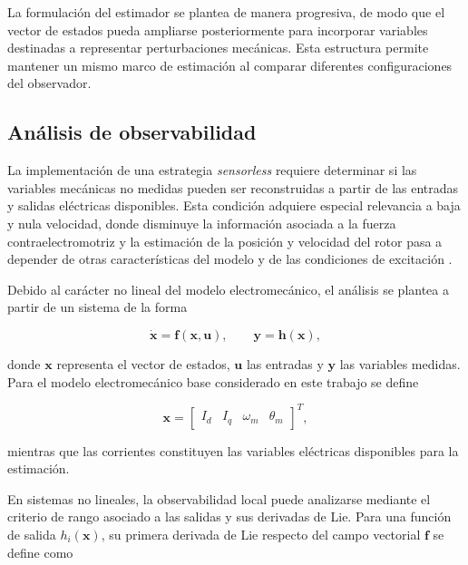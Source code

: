 La formulación del estimador se plantea de manera progresiva, de modo
que el vector de estados pueda ampliarse posteriormente para incorporar
variables destinadas a representar perturbaciones mecánicas. Esta
estructura permite mantener un mismo marco de estimación al comparar
diferentes configuraciones del observador.

\subsection{Análisis de observabilidad}
\label{subsec:analisis_observabilidad}

La implementación de una estrategia \textit{sensorless} requiere determinar si las
variables mecánicas no medidas pueden ser reconstruidas a partir de las entradas y
salidas eléctricas disponibles. Esta condición adquiere especial relevancia a baja y
nula velocidad, donde disminuye la información asociada a la fuerza
contraelectromotriz y la estimación de la posición y velocidad del rotor pasa a
depender de otras características del modelo y de las condiciones de excitación
\cite{zaltniObservabilityAnalysisPMSM2009,vaclavekACDriveObservability2013}.

Debido al carácter no lineal del modelo electromecánico, el análisis se plantea a
partir de un sistema de la forma

\begin{equation}
    \dot{\mathbf{x}}
    =
    \mathbf{f}(\mathbf{x},\mathbf{u}),
    \qquad
    \mathbf{y}
    =
    \mathbf{h}(\mathbf{x}),
\end{equation}

donde $\mathbf{x}$ representa el vector de estados, $\mathbf{u}$ las entradas y
$\mathbf{y}$ las variables medidas. Para el modelo electromecánico base considerado
en este trabajo se define

\begin{equation}
    \mathbf{x}
    =
    \begin{bmatrix}
        I_d &
        I_q &
        \omega_m &
        \theta_m
    \end{bmatrix}^{T},
\end{equation}

mientras que las corrientes constituyen las variables eléctricas disponibles para
la estimación.

En sistemas no lineales, la observabilidad local puede analizarse mediante el
criterio de rango asociado a las salidas y sus derivadas de Lie. Para una función
de salida $h_i(\mathbf{x})$, su primera derivada de Lie respecto del campo vectorial
$\mathbf{f}$ se define como

